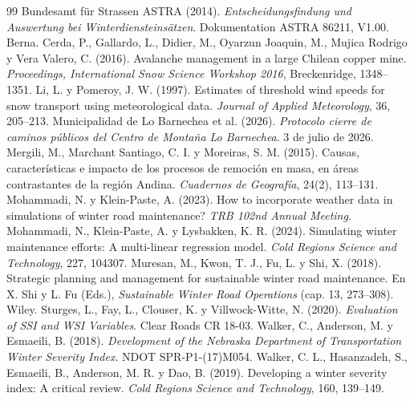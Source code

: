 \documentclass[11pt,a4paper]{article}
\begin{document}
\begin{thebibliography}{99}\small
{} Bundesamt für Strassen ASTRA (2014). \emph{Entscheidungsfindung und Auswertung bei Winterdiensteinsätzen}. Dokumentation ASTRA 86211, V1.00. Berna.
 Cerda, P., Gallardo, L., Didier, M., Oyarzun Joaquin, M., Mujica Rodrigo y Vera Valero, C. (2016). Avalanche management in a large Chilean copper mine. \emph{Proceedings, International Snow Science Workshop 2016}, Breckenridge, 1348--1351.
 Li, L. y Pomeroy, J. W. (1997). Estimates of threshold wind speeds for snow transport using meteorological data. \emph{Journal of Applied Meteorology}, 36, 205--213.
 Municipalidad de Lo Barnechea et al. (2026). \emph{Protocolo cierre de caminos públicos del Centro de Montaña Lo Barnechea}. 3 de julio de 2026.
 Mergili, M., Marchant Santiago, C. I. y Moreiras, S. M. (2015). Causas, características e impacto de los procesos de remoción en masa, en áreas contrastantes de la región Andina. \emph{Cuadernos de Geografía}, 24(2), 113--131.
 Mohammadi, N. y Klein-Paste, A. (2023). How to incorporate weather data in simulations of winter road maintenance? \emph{TRB 102nd Annual Meeting}.
 Mohammadi, N., Klein-Paste, A. y Lysbakken, K. R. (2024). Simulating winter maintenance efforts: A multi-linear regression model. \emph{Cold Regions Science and Technology}, 227, 104307.
 Muresan, M., Kwon, T. J., Fu, L. y Shi, X. (2018). Strategic planning and management for sustainable winter road maintenance. En X. Shi y L. Fu (Eds.), \emph{Sustainable Winter Road Operations} (cap. 13, 273--308). Wiley.
 Sturges, L., Fay, L., Clouser, K. y Villwock-Witte, N. (2020). \emph{Evaluation of SSI and WSI Variables}. Clear Roads CR 18-03.
 Walker, C., Anderson, M. y Esmaeili, B. (2018). \emph{Development of the Nebraska Department of Transportation Winter Severity Index}. NDOT SPR-P1-(17)M054.
 Walker, C. L., Hasanzadeh, S., Esmaeili, B., Anderson, M. R. y Dao, B. (2019). Developing a winter severity index: A critical review. \emph{Cold Regions Science and Technology}, 160, 139--149.
\end{thebibliography}

\appendix

\end{document}
